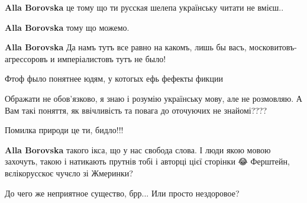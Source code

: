 \begin{itemize}
\begin{itemize}

\textbf{Alla Borovska} це тому що ти русская шелепа українську читати не вмієш..


\textbf{Alla Borovska} тому що можемо.


\textbf{Alla Borovska} Да намъ тутъ все равно на какомъ, лишь бы васъ, московитовъ-агрессоровъ и имперіалистовъ тутъ не было!


Фтоф фыло понятнее юдям, у котогых ефь фефекты фикции🤣🤣🤣


Ображати не обов'язково, я знаю і розумію українську мову, але не розмовляю. А Вам такі поняття, як ввічливість та повага до оточуючих не знайомі????


Помилка природи це ти, бидло!!!


\textbf{Alla Borovska} такого ікса, що у нас свобода слова. І люди якою мовою захочуть, такою і натикають прутнів тобі і авторці цієї сторінки 😂 Ферштейн, вєлікорусскоє чучєло зі Жмеринки?
\end{itemize}


До чего же неприятное существо, брр... Или просто нездоровое?

\begin{itemize}


\end{itemize}
\end{itemize}
